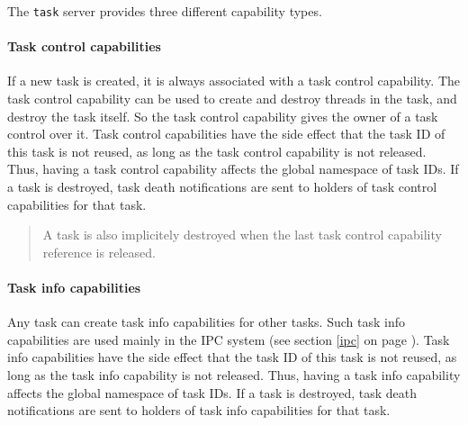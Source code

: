 \documentclass[9pt,a4paper]{extarticle}
\newenvironment{comment}{\footnotesize \begin{quote}}{\end{quote}}
\begin{document}
The \texttt{task} server provides three different capability types.

\paragraph{Task control capabilities}
If a new task is created, it is always associated with a task control
capability.  The task control capability can be used to create and
destroy threads in the task, and destroy the task itself.  So the task
control capability gives the owner of a task control over it.  Task
control capabilities have the side effect that the task ID of this
task is not reused, as long as the task control capability is not
released.  Thus, having a task control capability affects the global
namespace of task IDs.  If a task is destroyed, task death
notifications are sent to holders of task control capabilities for
that task.

\begin{comment}
  A task is also implicitely destroyed when the last task control
  capability reference is released.
\end{comment}

\paragraph{Task info capabilities}
\label{taskinfocap}
Any task can create task info capabilities for other tasks.  Such task
info capabilities are used mainly in the IPC system (see section
\ref{ipc} on page \pageref{ipc}).  Task info capabilities have the
side effect that the task ID of this task is not reused, as long as
the task info capability is not released.  Thus, having a task info
capability affects the global namespace of task IDs.  If a task is
destroyed, task death notifications are sent to holders of task info
capabilities for that task.
\end{document}
